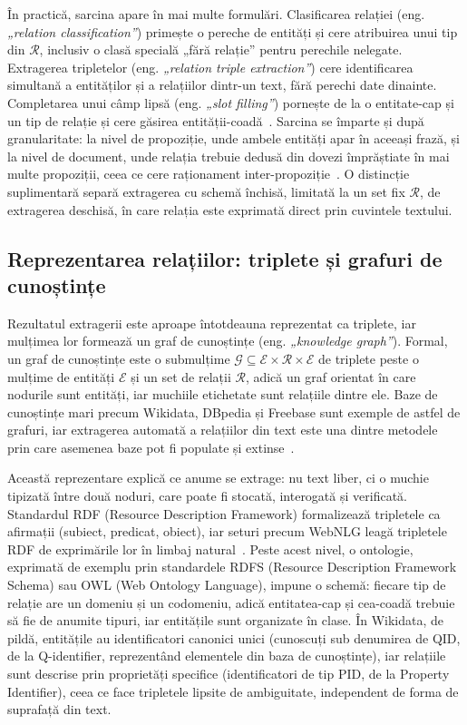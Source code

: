 În practică, sarcina apare în mai multe formulări. Clasificarea relației (eng. \textit{„relation classification”}) primește o pereche de entități și cere atribuirea unui tip din $\mathcal{R}$, inclusiv o clasă specială „fără relație” pentru perechile nelegate. Extragerea tripletelor (eng. \textit{„relation triple extraction”}) cere identificarea simultană a entităților și a relațiilor dintr-un text, fără perechi date dinainte. Completarea unui câmp lipsă (eng. \textit{„slot filling”}) pornește de la o entitate-cap și un tip de relație și cere găsirea entității-coadă~\cite{levy2017zeroshot}. Sarcina se împarte și după granularitate: la nivel de propoziție, unde ambele entități apar în aceeași frază, și la nivel de document, unde relația trebuie dedusă din dovezi împrăștiate în mai multe propoziții, ceea ce cere raționament inter-propoziție~\cite{yao2019docred}. O distincție suplimentară separă extragerea cu schemă închisă, limitată la un set fix $\mathcal{R}$, de extragerea deschisă, în care relația este exprimată direct prin cuvintele textului.

\subsection{Reprezentarea relațiilor: triplete și grafuri de cunoștințe}

Rezultatul extragerii este aproape întotdeauna reprezentat ca triplete, iar mulțimea lor formează un graf de cunoștințe (eng. \textit{„knowledge graph”}). Formal, un graf de cunoștințe este o submulțime $\mathcal{G} \subseteq \mathcal{E} \times \mathcal{R} \times \mathcal{E}$ de triplete peste o mulțime de entități $\mathcal{E}$ și un set de relații $\mathcal{R}$, adică un graf orientat în care nodurile sunt entități, iar muchiile etichetate sunt relațiile dintre ele. Baze de cunoștințe mari precum Wikidata, DBpedia și Freebase sunt exemple de astfel de grafuri, iar extragerea automată a relațiilor din text este una dintre metodele prin care asemenea baze pot fi populate și extinse~\cite{elsahar2018trex}.

Această reprezentare explică ce anume se extrage: nu text liber, ci o muchie tipizată între două noduri, care poate fi stocată, interogată și verificată. Standardul RDF (Resource Description Framework) formalizează tripletele ca afirmații (subiect, predicat, obiect), iar seturi precum WebNLG leagă tripletele RDF de exprimările lor în limbaj natural~\cite{gardent2017webnlg}. Peste acest nivel, o ontologie, exprimată de exemplu prin standardele RDFS (Resource Description Framework Schema) sau OWL (Web Ontology Language), impune o schemă: fiecare tip de relație are un domeniu și un codomeniu, adică entitatea-cap și cea-coadă trebuie să fie de anumite tipuri, iar entitățile sunt organizate în clase. În Wikidata, de pildă, entitățile au identificatori canonici unici (cunoscuți sub denumirea de QID, de la Q-identifier, reprezentând elementele din baza de cunoștințe), iar relațiile sunt descrise prin proprietăți specifice (identificatori de tip PID, de la Property Identifier), ceea ce face tripletele lipsite de ambiguitate, independent de forma de suprafață din text.

